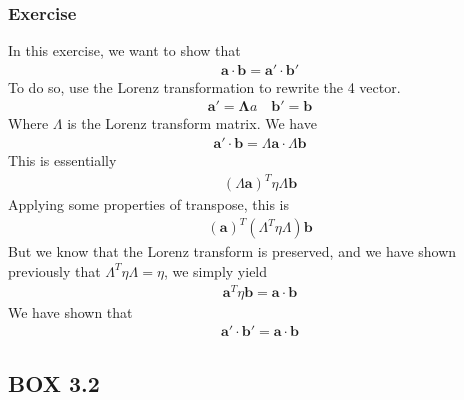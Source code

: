 \documentclass[12pt]{book}
\newcommand{\paren}[1]{\left( #1 \right)}
\begin{document}
            \subsubsection{Exercise}
            In this exercise, we want to show that
            \begin{align}
            \mathbf{a}\cdot \mathbf{b} = \mathbf{a}' \cdot \mathbf{b}'
            \end{align}
            To do so, use the Lorenz transformation to rewrite the 4 vector. 
            \begin{align}
            \mathbf{a}' = \mathbf{\Lambda}a \quad \mathbf{b}' = \mathbf{b}
            \end{align}
            Where $\Lambda$ is the Lorenz transform matrix. We have
            \begin{align}
            \mathbf{a}'\cdot \mathbf{b} = \Lambda\mathbf{a}\cdot \Lambda\mathbf{b}
            \end{align}
            This is essentially
            \begin{align}
            \paren{\Lambda \mathbf{a}}^T\eta\Lambda\mathbf{b}
            \end{align}
            Applying some properties of transpose, this is
            \begin{align}
            \paren{\mathbf{a}}^T\paren{\Lambda^T\eta\Lambda}\mathbf{b}
            \end{align}
            But we know that the Lorenz transform is preserved, and we have shown previously that $\Lambda^T\eta\Lambda = \eta$, we simply yield
            \begin{align}
            \mathbf{a}^T\eta\mathbf{b} = \mathbf{a}\cdot\mathbf{b}
            \end{align}
            We have shown that
            \begin{align}
            \mathbf{a}'\cdot\mathbf{b}' =\mathbf{a}\cdot\mathbf{b}
            \end{align}

        \subsection{BOX 3.2}
\end{document}
